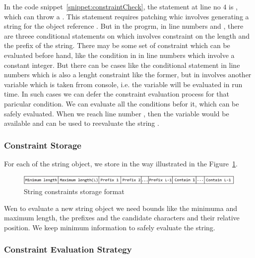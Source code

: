 In the code snippet~\ref{snippet:constraintCheck}, the statement at line no $4$
is , which can throw a
. This statement requires patching whic
involves generating a string for the object reference . But in the
progrm, in line numbers  and , there are threee
conditional statements on  which involves constraint on the length
and the prefix of the string. There may be some set of constraint which can be
evaluated before hand, like the condition in in line numbers  which
involve a constant integer. But there can be cases like the conditional
statement in line numbers  which is also a lenght constraint like the
former, but in involves another variable which is taken frrom console, i.e. the
variable will be evaluated in run time. In such cases we can defer the
constraint evaluation process for that paricular condition. We can evaluate all
the conditions befor it, which can be safely evaluated. When we reach line
number , then the variable  would be available and can be
used to reevaluate the string .

\subsubsection{Constraint Storage}
\label{subsubsec:constraintStorage}

For each of the string object, we store in the way illustrated in the
Figure~\ref{fig:constraint}.

\begin{figure}[t]
\centering
\includegraphics[width=\linewidth]{images/constraint.eps}
\caption{String constraints storage format}
\label{fig:constraint}
\end{figure}

Wen to evaluate a new string object we need bounds like the minimuma and maximum
length, the prefixes and the candidate characters and their relative position.
We keep minimum information to safely evaluate the string.

\subsubsection{Constraint Evaluation Strategy}
\label{subsubsec:constraintStorage}

